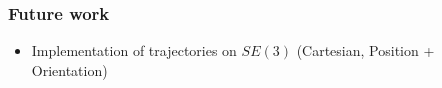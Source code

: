 \begin{frame}[t]
	\frametitle{Future work}

	\begin{itemize}
		\item Implementation of trajectories on $SE(3)$ (Cartesian, Position + Orientation)
	\end{itemize}
\end{frame}
